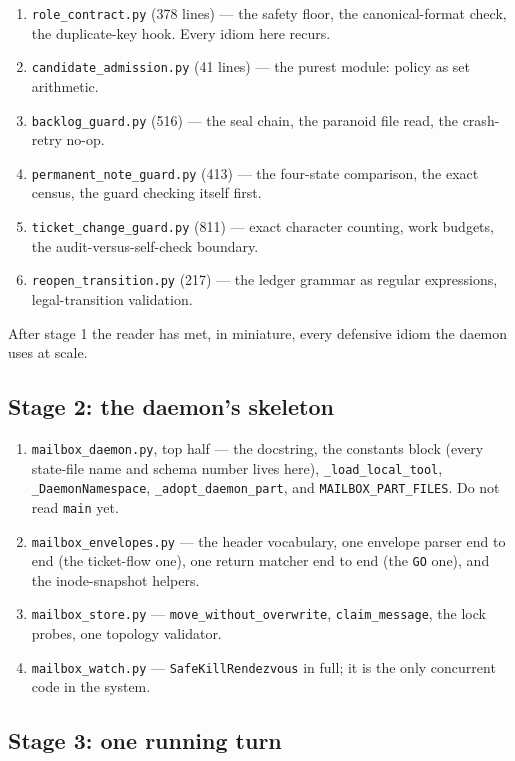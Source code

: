 \documentclass[10pt,aps,prd,twocolumn,nofootinbib]{revtex4-2}
\newcommand{\code}[1]{\texttt{#1}}
\newcommand{\file}[1]{\texttt{#1}}
\begin{document}
\begin{enumerate}
  \item \file{role\_contract.py} (378 lines) --- the safety floor, the
  canonical-format check, the duplicate-key hook.  Every idiom here
  recurs.
  \item \file{candidate\_admission.py} (41 lines) --- the purest
  module: policy as set arithmetic.
  \item \file{backlog\_guard.py} (516) --- the seal chain, the
  paranoid file read, the crash-retry no-op.
  \item \file{permanent\_note\_guard.py} (413) --- the four-state
  comparison, the exact census, the guard checking itself first.
  \item \file{ticket\_change\_guard.py} (811) --- exact character
  counting, work budgets, the audit-versus-self-check boundary.
  \item \file{reopen\_transition.py} (217) --- the ledger grammar as
  regular expressions, legal-transition validation.
\end{enumerate}

After stage 1 the reader has met, in miniature, every defensive idiom
the daemon uses at scale.

\subsection{Stage 2: the daemon's skeleton}

\begin{enumerate}
  \item \file{mailbox\_daemon.py}, top half --- the docstring, the
  constants block (every state-file name and schema number lives
  here), \code{\_load\_local\_tool}, \code{\_DaemonNamespace},
  \code{\_adopt\_daemon\_part}, and \code{MAILBOX\_PART\_FILES}.
  Do not read \code{main} yet.
  \item \file{mailbox\_envelopes.py} --- the header vocabulary, one
  envelope parser end to end (the ticket-flow one), one return
  matcher end to end (the \code{GO} one), and the inode-snapshot
  helpers.
  \item \file{mailbox\_store.py} --- \code{move\_without\_overwrite},
  \code{claim\_message}, the lock probes, one topology validator.
  \item \file{mailbox\_watch.py} --- \code{SafeKillRendezvous} in
  full; it is the only concurrent code in the system.
\end{enumerate}

\subsection{Stage 3: one running turn}
\end{document}

